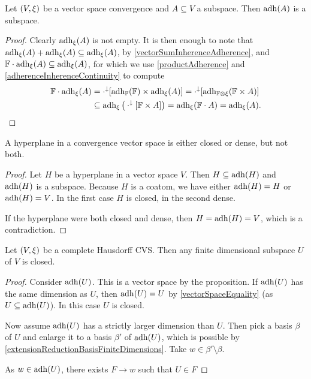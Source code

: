 \begin{proposition}
Let $\sSet{V,\xi}$ be a vector space convergence and $A\subseteq V$ a subspace. Then $\operatorname{adh}(A)$ is a subspace.
\end{proposition}
\begin{proof}
Clearly $\operatorname{adh}_\xi(A)$ is not empty. It is then enough to note that $\operatorname{adh}_\xi(A)+\operatorname{adh}_\xi(A)\subseteq \operatorname{adh}_\xi(A)$, by \ref{vectorSumInherenceAdherence}, and $\mathbb{F}\cdot \operatorname{adh}_\xi(A) \subseteq \operatorname{adh}_\xi(A)$, for which we use \ref{productAdherence} and \ref{adherenceInherenceContinuity} to compute
\begin{align*}
\mathbb{F}\cdot \operatorname{adh}_\xi(A) &= \cdot^\downarrow[\operatorname{adh}_{\mathbb{F}}(\mathbb{F})\times \operatorname{adh}_\xi(A)] = \cdot^\downarrow[\operatorname{adh}_{\mathbb{F}\otimes \xi}(\mathbb{F}\times A)] \\
&\subseteq \operatorname{adh}_{\xi}\big(\cdot^\downarrow[\mathbb{F}\times A]\big) = \operatorname{adh}_{\xi}(\mathbb{F}\cdot A) = \operatorname{adh}_\xi(A).
\end{align*}
\end{proof}
\begin{corollary} \label{hyperplaneClosedDense}
A hyperplane in a convergence vector space is either closed or dense, but not both.
\end{corollary}
\begin{proof}
Let $H$ be a hyperplane in a vector space $V$. Then $H \subseteq \operatorname{adh}(H)$ and $\operatorname{adh}(H)$ is a subspace. Because $H$ is a coatom, we have either $\operatorname{adh}(H) = H$ or $\operatorname{adh}(H) = V$. In the first case $H$ is closed, in the second dense.

If the hyperplane were both closed and dense, then $H = \operatorname{adh}(H) = V$, which is a contradiction.
\end{proof}
\begin{corollary}
Let $\sSet{V,\xi}$ be a complete Hausdorff CVS. Then any finite dimensional subspace $U$ of $V$ is closed.
\end{corollary}
\begin{proof}
Consider $\operatorname{adh}(U)$. This is a vector space by the proposition. If $\operatorname{adh}(U)$ has the same dimension as $U$, then $\operatorname{adh}(U) = U$ by \ref{vectorSpaceEquality} (as $U \subseteq \operatorname{adh}(U)$). In this case $U$ is closed.

Now assume $\operatorname{adh}(U)$ has a strictly larger dimension than $U$. Then pick a basis $\beta$ of $U$ and enlarge it to a basis $\beta'$ of $\operatorname{adh}(U)$, which is possible by \ref{extensionReductionBasisFiniteDimensions}. Take $w\in \beta'\setminus \beta$.

As $w\in\operatorname{adh}(U)$, there exists $F\to w$ such that $U\in F$
\end{proof}


